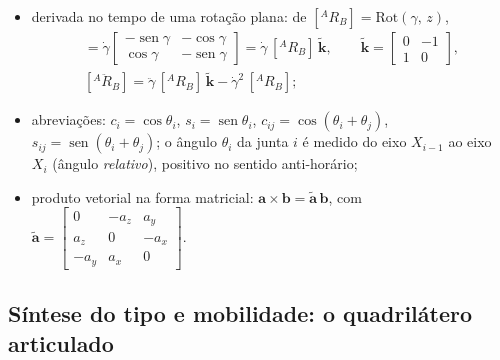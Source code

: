 \documentclass[12pt,a4paper,twoside]{article}
\DeclareMathOperator{\sen}{sen}
\newcommand{\rv}[2]{{}^{#1}\mathbf{r}_{#2}}          %
\newcommand{\Rmd}[2]{[{}^{#1}\dot R_{#2}]}             %
\newcommand{\Rmdd}[2]{[{}^{#1}\ddot R_{#2}]}
\newcommand{\Et}{\tilde{\mathbf k}}                   %
\newcommand{\Rm}[2]{[{}^{#1}R_{#2}]}                 %
\newcommand{\Rot}[2]{\mathrm{Rot}(#1,\,#2)}
\numberwithin{equation}{section}
\begin{document}
\begin{itemize}
\begin{equation}
  \end{equation}
  para uma cadeia de bases $0, 1, 2$, aplica-se \eqref{eq:mudancabase} duas vezes, de dentro para fora:
  \begin{equation}
    \rv{0}{P} = \rv{0}{O_1} + \Rm{0}{1}\Big(\rv{1}{O_2} + \Rm{1}{2}\,\rv{2}{P}\Big),
    \qquad
    \Rm{0}{2} = \Rm{0}{1}\,\Rm{1}{2} ;
    \label{eq:cadeia}
  \end{equation}
  \item derivada no tempo de uma rotação plana: de $\Rm{A}{B} = \Rot{\gamma}{z}$,
  \begin{gather}
    \Rmd{A}{B} = \dot\gamma\begin{bmatrix} -\sen\gamma & -\cos\gamma \\ \cos\gamma & -\sen\gamma \end{bmatrix}
             = \dot\gamma\,\Rm{A}{B}\,\Et ,
    \qquad
    \Et = \begin{bmatrix} 0 & -1 \\ 1 & 0 \end{bmatrix},
    \label{eq:derivR}\\
    \Rmdd{A}{B} = \ddot\gamma\,\Rm{A}{B}\,\Et - \dot\gamma^2\,\Rm{A}{B} ;
  \end{gather}
  \item abreviações: $c_i = \cos\theta_i$, $s_i = \sen\theta_i$, $c_{ij} = \cos(\theta_i+\theta_j)$,
  $s_{ij} = \sen(\theta_i+\theta_j)$; o ângulo $\theta_i$ da junta $i$ é medido do eixo $X_{i-1}$ ao
  eixo $X_i$ (ângulo \emph{relativo}), positivo no sentido anti-horário;
  \item produto vetorial na forma matricial: $\mathbf a \times \mathbf b = \tilde{\mathbf a}\,\mathbf b$, com
  $\tilde{\mathbf a} = \begin{bmatrix} 0 & -a_z & a_y\\ a_z & 0 & -a_x\\ -a_y & a_x & 0\end{bmatrix}$.
\end{itemize}

\subsection{Síntese do tipo e mobilidade: o quadrilátero articulado}
\end{document}
